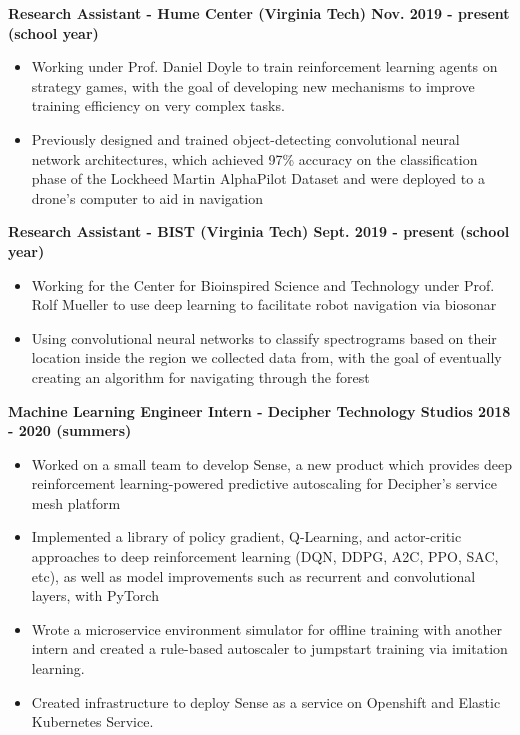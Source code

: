 \documentclass{article}
\begin{document}
\begin{center}
\begin{flushleft}
    \textbf{Research Assistant - Hume Center (Virginia Tech) \hfill Nov. 2019 - present (school year)}
    \begin{itemize}
      \itemsep0em
      \item Working under Prof. Daniel Doyle to train reinforcement learning agents on strategy games, with the goal of developing new mechanisms to improve training efficiency on very complex tasks. 
      \item Previously designed and trained object-detecting convolutional neural network architectures, which achieved 97\% accuracy on the classification phase of the Lockheed Martin AlphaPilot Dataset and were deployed to a drone's computer to aid in navigation
    \end{itemize}

    \textbf{Research Assistant - BIST (Virginia Tech) \hfill Sept. 2019 - present (school year)}
    \begin{itemize}
      \itemsep0em
      \item Working for the Center for Bioinspired Science and Technology under Prof. Rolf Mueller to use deep learning to facilitate robot navigation via biosonar
      \item Using convolutional neural networks to classify spectrograms based on their location inside the region we collected data from, with the goal of eventually creating an algorithm for navigating through the forest 
    \end{itemize}


    \textbf{Machine Learning Engineer Intern - Decipher Technology Studios \hfill 2018 - 2020 (summers)}
    \begin{itemize}
      \itemsep0em
      \item Worked on a small team to develop Sense, a new product which provides deep reinforcement learning-powered predictive autoscaling for Decipher’s service mesh platform
      \item Implemented a library of policy gradient, Q-Learning, and actor-critic approaches to deep reinforcement learning (DQN, DDPG, A2C, PPO, SAC, etc), as well as model improvements such as recurrent and convolutional layers, with PyTorch
      \item Wrote a microservice environment simulator for offline training with another intern and created a rule-based autoscaler to jumpstart training via imitation learning.
      \item Created infrastructure to deploy Sense as a service on Openshift and Elastic Kubernetes Service.
    \end{itemize}



\end{flushleft}
\end{center}
\end{document}
